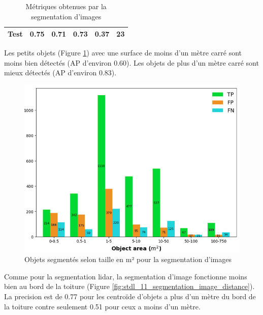 {{{{\begin{table}[H]
\begin{tabular}{|l|c|c|c|c|c|}
    Test & 0.75 & 0.71 & 0.73 & 0.37 & 23 \\
    \hline
    \end{tabular}
    \caption{Métriques obtenues par la segmentation d'images}
    \label{tab:stdl_06_segmentation_image_resultats}
\end{table}
\par{Les petits objets (Figure \ref{fig:stdl_10_segmentation_image_taille}) avec une surface de moins d'un mètre carré sont moins bien détectés (AP d'environ 0.60). Les objets de plus d'un mètre carré sont mieux détectés (AP d'environ 0.83).}
\begin{figure}[H]
    \centering
    \includegraphics[width=1\linewidth]{02-main//figures/stdl_10_segmentation_image_taille.png}
    \caption{Objets segmentés selon taille en m² pour la segmentation d’images \cite{herny_detection_2024}}
    \label{fig:stdl_10_segmentation_image_taille}
\end{figure}
\newpage
\par{Comme pour la segmentation \gls{lidar}, la segmentation d'image fonctionne moins bien au bord de la toiture (Figure \ref{fig:stdl_11_segmentation_image_distance}). La precision est de 0.77 pour les centroïde d'objets a plus d'un mètre du bord de la toiture contre seulement 0.51 pour ceux a moins d'un mètre.}

}}}}
